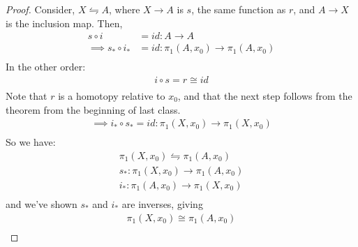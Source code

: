         \begin{proof}
            Consider, $X \leftrightharpoons A$, where
            $X\rightarrow A$ is $s$, the same function as $r$,
            and $A\rightarrow X$ is the inclusion map. Then,
            \begin{align*}
                s\circ i &= id: A\rightarrow A\\
                \implies s_* \circ i_* &= id: \pi_1(A,x_0)\rightarrow\pi_1(A,x_0)\\
            \end{align*}
            In the other order:
            \begin{align*}
                i\circ s = r\cong id\\
            \end{align*}
            Note that $r$ is a homotopy relative to $x_0$, and
            that the next step follows from the theorem from the beginning of
            last class.
            \begin{align*}
                \implies i_* \circ s_* = id: \pi_1(X,x_0)\rightarrow\pi_1(X,x_0)\\
            \end{align*}
            So we have:
            \begin{align*}
                \pi_1(X,x_0)\leftrightharpoons\pi_1(A,x_0)\\
                s_*:\pi_1(X,x_0)\rightarrow\pi_1(A,x_0)\\
                i_*:\pi_1(A,x_0)\rightarrow\pi_1(X,x_0)\\
            \end{align*}
            and we've shown $s_*$ and $i_*$ are inverses, giving
            \begin{align*}
                \pi_1(X,x_0)\cong\pi_1(A,x_0)\\
            \end{align*}
        \end{proof}
